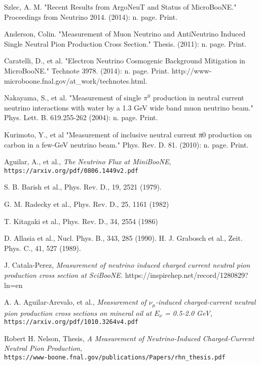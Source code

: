 \documentclass[12pt]{article}
\begin{document}
\begin{thebibliography}{20}
Szlec, A. M. "Recent Results from ArgoNeuT and Status of MicroBooNE." Proceedings from Neutrino 2014. (2014): n. page. Print.

Anderson, Colin. "Measurement of Muon Neutrino and AntiNeutrino Induced Single Neutral Pion Production Cross Section." Thesis. (2011): n. page. Print.

Caratelli, D., et al. "Electron Neutrino Cosmogenic Background Mitigation in MicroBooNE." Technote 3978. (2014): n. page. Print. http://www-microboone.fnal.gov/at\_work/technotes.html.

Nakayama, S., et al. "Measurement of single $\pi^0$ production in neutral current neutrino interactions with water by a 1.3 GeV wide band muon neutrino beam." Phys. Lett. B. 619.255-262 (2004): n. page. Print.

Kurimoto, Y., et al "Measurement of inclusive neutral current π0 production on carbon in a few-GeV neutrino beam." Phys. Rev. D. 81. (2010): n. page. Print.

  Aguilar, A., et al., \emph{The Neutrino Flux at MiniBooNE},\\
    \texttt{https://arxiv.org/pdf/0806.1449v2.pdf}

  S. B. Barish et al., Phys. Rev. D., 19, 2521 (1979).

 G. M. Radecky et al., Phys. Rev. D., 25, 1161 (1982)
 
 T. Kitagaki et al., Phys. Rev. D., 34, 2554 (1986)
 
 D. Allasia et al., Nucl. Phys. B., 343, 285 (1990).
 H. J. Grabosch et al., Zeit. Phys. C., 41, 527 (1989).

J. Catala-Perez, \emph{Measurement of neutrino induced charged current neutral pion production cross section at SciBooNE.}
https://inspirehep.net/record/1280829?ln=en

  A. A. Aguilar-Arevalo, et al., \emph{Measurement of $\nu_\mu$-induced charged-current neutral pion production cross sections on mineral oil at $E_\nu$ = 0.5-2.0 GeV},\\
  \texttt{https://arxiv.org/pdf/1010.3264v4.pdf}

  Robert H. Nelson, Thesis, \emph{A Measurement of Neutrino-Induced Charged-Current Neutral Pion Production},\\
  \texttt{https://www-boone.fnal.gov/publications/Papers/rhn\_thesis.pdf}
  

\end{thebibliography}
\end{document}
